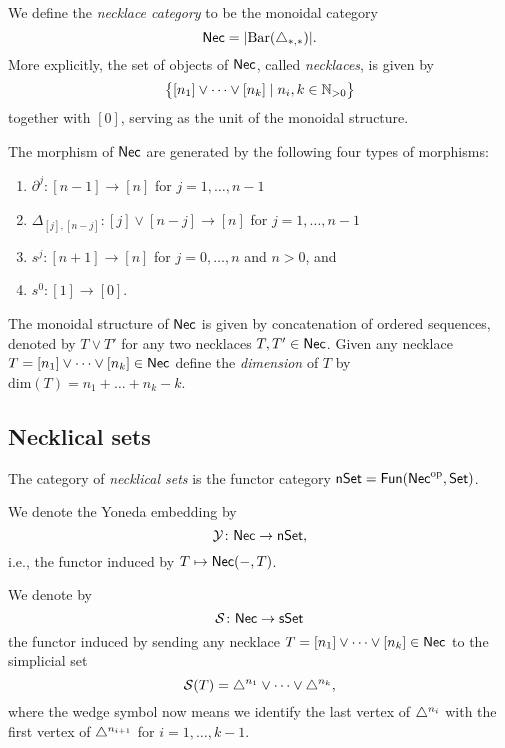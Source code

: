 We define the \textit{necklace category} to be the monoidal category
\begin{equation*}
\mathsf{Nec} = \vert{\operatorname{Bar}(\triangle_{*,*})}\vert.
\end{equation*}
More explicitly, the set of objects of $\mathsf{Nec}$, called \textit{necklaces}, is given by
\begin{equation*}
\big\{ [n_1] \vee \cdots \vee[n_k] \mid n_i, k \in \mathbb{N}_{>0} \big\}
\end{equation*}
together with $[0]$, serving as the unit of the monoidal structure.

The morphism of $\mathsf{Nec}$ are generated by the following four types of morphisms:
\begin{enumerate}
	\item $\partial^j \colon [n-1] \to [n]$ for $j = 1, \dots, n-1$
	\item $\Delta_{[j], [n-j]} \colon  [j] \vee [n-j] \to [n]$ for $j = 1, \dots, n-1$
	\item $s^j \colon [n+1] \to [n]$ for $j = 0, \dots, n$ and $n>0$, and 
	\item $s^0 \colon [1] \to [0]$.
\end{enumerate}
The monoidal structure of $\mathsf{Nec}$ is given by concatenation of ordered sequences, denoted by $T \vee T'$ for any two necklaces $T, T' \in \mathsf{Nec}$.
Given any necklace $T = [n_1] \vee \dots \vee[n_k] \in \mathsf{Nec}$ define the \textit{dimension} of $T$ by $\text{dim}(T)=n_1 + \dots + n_k-k$.

\subsection{Necklical sets}

The category of \textit{necklical sets} is the functor category $\mathsf{nSet} = \mathsf{Fun}(\mathsf{Nec}^{\mathrm{op}}, \mathsf{Set})$.

We denote the Yoneda embedding by
$$\mathcal{Y} \colon \mathsf{Nec} \to \mathsf{nSet},$$
i.e., the functor induced by $T \mapsto \mathsf{Nec}(-,T)$.

We denote by
\begin{equation*}
\mathcal{S} \colon \mathsf{Nec} \to \mathsf{sSet}
\end{equation*}
the functor induced by sending any necklace $T = [n_1] \vee \dots \vee[n_k] \in \mathsf{Nec}$ to the simplicial set
\begin{equation*}
\mathcal{S}(T)= \triangle^{n_1} \vee\dots \vee \triangle^{n_k},
\end{equation*}
where the wedge symbol now means we identify the last vertex of $\triangle^{n_i}$ with the first vertex of $\triangle^{n_{i+1}}$ for $i = 1, \dots, k-1$.

